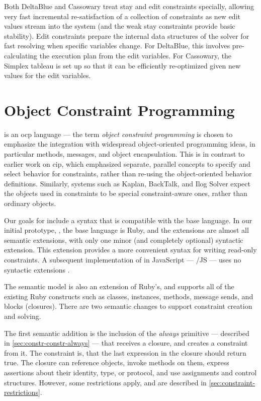 Both DeltaBlue and Cassowary treat stay and edit constraints
specially, allowing very fast incremental re-satisfaction of a
collection of constraints as new edit values stream into the system
(and the weak stay constraints provide basic stability). Edit
constraints prepare the internal data structures of the solver for
fast resolving when specific variables change. For DeltaBlue, this
involves pre-calculating the execution plan from the edit variables.
For Cassowary, the Simplex tableau is set up so that it can be
efficiently re-optimized given new values for the edit variables.

\section{Object Constraint Programming}
\label{sec:object-constraint-programming}
\langname is an \ac{ocp} language --- the term \emph{object constraint
  programming} is chosen to emphasize the integration with widespread
object-oriented programming ideas, in particular methods, messages,
and object encapsulation.  This is in contrast to earlier work on
\ac{cip}, which emphasized separate, parallel concepts to specify and
select behavior for constraints, rather than re-using the
object-oriented behavior definitions.  Similarly, systems 
such as Kaplan, BackTalk, and Ilog Solver 
expect the objects used in constraints to be special constraint-aware
ones, rather than ordinary objects.

Our goals for \langname include a syntax that is compatible with the
base language. In our initial prototype, \toolname, the base language is Ruby,
and the extensions are almost all semantic extensions, with only one
minor (and completely optional) syntactic extension. This extension
provides a more convenient syntax for writing read-only constraints. A
subsequent implementation of \langname in JavaScript ---
\langname/JS --- uses no syntactic extensions \cite{felgentreff-ecoop-2014}.

The semantic model is also an extension of Ruby's, and supports all of
the existing Ruby constructs such as classes, instances, methods,
message sends, and blocks (closures). There are two semantic changes
to support constraint creation and solving.

The first semantic addition is the inclusion of the \emph{always}
primitive --- described in \autoref{sec:constr-constr-always} --- that
receives a closure, and creates a constraint from it. The constraint
is, that the last expression in the closure should return true. The
closure can reference objects, invoke methods on them, express
assertions about their identity, type, or protocol, and use
assignments and control structures. However, some restrictions apply,
and are described in \autoref{sec:constraint-restrictions}.

